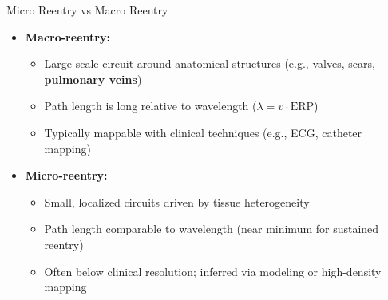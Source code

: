 \documentclass[aspectratio=43]{beamer}
\begin{document}
\begin{frame}{Micro Reentry vs Macro Reentry}
\begin{itemize}
	\item \textbf{Macro-reentry:} \cite{cvphysiology_reentry} 
    \begin{itemize}
		\item Large-scale circuit around anatomical structures (e.g., valves, scars, \textbf{pulmonary veins})
        \item Path length is long relative to wavelength ($\lambda = v \cdot \text{ERP}$)
        \item Typically mappable with clinical techniques (e.g., ECG, catheter mapping)
    \end{itemize}

	\item \textbf{Micro-reentry:} \cite{oliveira2018microreentry}
    \begin{itemize}
        \item Small, localized circuits driven by tissue heterogeneity
        \item Path length comparable to wavelength (near minimum for sustained reentry)
        \item Often below clinical resolution; inferred via modeling or high-density mapping
    \end{itemize}
\end{itemize}
\end{frame}
\end{document}
